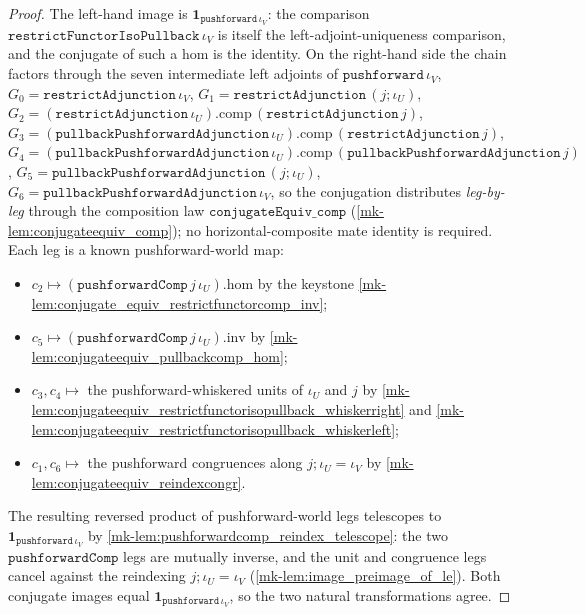 \begin{proof}
  The left-hand image is \(\mathbf{1}_{\mathtt{pushforward}\,\iota_V}\): the comparison
  \(\mathtt{restrictFunctorIsoPullback}\,\iota_V\) is itself the left-adjoint-uniqueness comparison,
  and the conjugate of such a hom is the identity. On the right-hand side the chain factors through
  the seven intermediate left adjoints of \(\mathtt{pushforward}\,\iota_V\),
  \(G_0 = \mathtt{restrictAdjunction}\,\iota_V\),
  \(G_1 = \mathtt{restrictAdjunction}\,(j \mathbin{;} \iota_U)\),
  \(G_2 = (\mathtt{restrictAdjunction}\,\iota_U).\mathrm{comp}\,(\mathtt{restrictAdjunction}\,j)\),
  \(G_3 = (\mathtt{pullbackPushforwardAdjunction}\,\iota_U).\mathrm{comp}\,(\mathtt{restrictAdjunction}\,j)\),
  \(G_4 = (\mathtt{pullbackPushforwardAdjunction}\,\iota_U).\mathrm{comp}\,(\mathtt{pullbackPushforwardAdjunction}\,j)\),
  \(G_5 = \mathtt{pullbackPushforwardAdjunction}\,(j \mathbin{;} \iota_U)\),
  \(G_6 = \mathtt{pullbackPushforwardAdjunction}\,\iota_V\), so the conjugation distributes
  \emph{leg-by-leg} through the composition law \(\mathtt{conjugateEquiv\_comp}\)
  (\ref{mk-lem:conjugateequiv_comp}); no horizontal-composite mate identity is required. Each leg is a
  known pushforward-world map:
  \begin{itemize}
    \item \(c_2 \mapsto (\mathtt{pushforwardComp}\,j\,\iota_U).\mathrm{hom}\) by the keystone
      \ref{mk-lem:conjugate_equiv_restrictfunctorcomp_inv};
    \item \(c_5 \mapsto (\mathtt{pushforwardComp}\,j\,\iota_U).\mathrm{inv}\) by
      \ref{mk-lem:conjugateequiv_pullbackcomp_hom};
    \item \(c_3, c_4 \mapsto\) the pushforward-whiskered units of \(\iota_U\) and \(j\) by
      \ref{mk-lem:conjugateequiv_restrictfunctorisopullback_whiskerright} and
      \ref{mk-lem:conjugateequiv_restrictfunctorisopullback_whiskerleft};
    \item \(c_1, c_6 \mapsto\) the pushforward congruences along
      \(j \mathbin{;} \iota_U = \iota_V\) by \ref{mk-lem:conjugateequiv_reindexcongr}.
  \end{itemize}
  The resulting reversed product of pushforward-world legs telescopes to
  \(\mathbf{1}_{\mathtt{pushforward}\,\iota_V}\) by \ref{mk-lem:pushforwardcomp_reindex_telescope}: the
  two \(\mathtt{pushforwardComp}\) legs are mutually inverse, and the unit and congruence legs cancel
  against the reindexing \(j \mathbin{;} \iota_U = \iota_V\) (\ref{mk-lem:image_preimage_of_le}). Both
  conjugate images equal \(\mathbf{1}_{\mathtt{pushforward}\,\iota_V}\), so the two natural
  transformations agree.
\end{proof}

